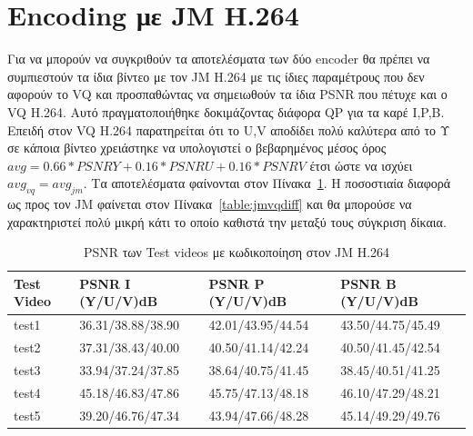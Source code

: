 \newpage
\section{Encoding με JM H.264}
\label{section:sect62}

\indent Για να μπορούν να συγκριθούν τα αποτελέσματα των δύο encoder θα πρέπει να συμπιεστούν τα ίδια βίντεο με τον JM H.264 με τις ίδιες παραμέτρους που δεν αφορούν το VQ και προσπαθώντας να σημειωθούν τα ίδια PSNR που πέτυχε και ο VQ H.264. Αυτό πραγματοποιήθηκε δοκιμάζοντας διάφορα QP για τα καρέ I,P,B. Επειδή στον VQ H.264 παρατηρείται ότι το U,V αποδίδει πολύ καλύτερα από το Υ σε κάποια βίντεο χρειάστηκε να υπολογιστεί ο βεβαρημένος μέσος όρος $avg = 0.66*PSNRY+0.16*PSNRU+0.16*PSNRV$ έτσι ώστε να ισχύει $avg_{vq}=avg_{jm}$. Τα αποτελέσματα φαίνονται στον Πίνακα~\ref{table:jm264}.
Η ποσοστιαία διαφορά ως προς τον JM φαίνεται στον Πίνακα~\ref{table:jmvqdiff} και θα μπορούσε να χαρακτηριστεί πολύ μικρή κάτι το οποίο καθιστά την μεταξύ τους σύγκριση δίκαια.

\begin{table}[h!]
    \begin{center}
        \begin{tabular}{| l | l | l | l |}
        \hline
        Test Video & PSNR I (Y/U/V)dB  & PSNR P (Y/U/V)dB  & PSNR B (Y/U/V)dB       \\ \hline
        test1      & 36.31/38.88/38.90 & 42.01/43.95/44.54 & 43.50/44.75/45.49      \\ \hline
        test2      & 37.31/38.43/40.00 & 40.50/41.14/42.24 & 40.50/41.45/42.54      \\ \hline
        test3      & 33.94/37.24/37.85 & 38.64/40.75/41.45 & 38.45/40.51/41.25      \\ \hline
        test4      & 45.18/46.83/47.86 & 45.75/47.13/48.18 & 46.10/47.29/48.21      \\ \hline
        test5      & 39.20/46.76/47.34 & 43.94/47.66/48.28 & 45.14/49.29/49.76      \\ \hline
        \hline
        \end{tabular}
    \end{center}

    \caption{PSNR των Test videos με κωδικοποίηση στον JM H.264}
    \label{table:jm264}
\end{table}

